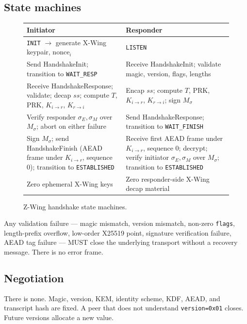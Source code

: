 \documentclass[11pt,a4paper]{article}
\begin{document}
\subsection{State machines}

\begin{figure}[H]
\centering
\begin{tabularx}{\textwidth}{XX}
\toprule
\textbf{Initiator} & \textbf{Responder} \\
\midrule
\texttt{INIT} $\to$ generate X-Wing keypair, $\mathrm{nonce}_i$ &
\texttt{LISTEN} \\
Send HandshakeInit; transition to \texttt{WAIT\_RESP} &
Receive HandshakeInit; validate magic, version, flags, lengths \\
Receive HandshakeResponse; validate; decap $ss$; compute $T$, $\mathrm{PRK}$, $K_{i\to r}$, $K_{r\to i}$ &
Encap $ss$; compute $T$, $\mathrm{PRK}$, $K_{i\to r}$, $K_{r\to i}$; sign $M_{\sigma}$ \\
Verify responder $\sigma_E, \sigma_M$ over $M_{\sigma}$; abort on either failure &
Send HandshakeResponse; transition to \texttt{WAIT\_FINISH} \\
Sign $M_{\sigma}$; send HandshakeFinish (AEAD frame under $K_{i\to r}$, sequence 0); transition to \texttt{ESTABLISHED} &
Receive first AEAD frame under $K_{i\to r}$, sequence 0; decrypt; verify initiator $\sigma_E, \sigma_M$ over $M_{\sigma}$; transition to \texttt{ESTABLISHED} \\
Zero ephemeral X-Wing keys & Zero responder-side X-Wing decap material \\
\bottomrule
\end{tabularx}
\caption{Z-Wing handshake state machines.}
\end{figure}

Any validation failure --- magic mismatch, version mismatch, non-zero
\texttt{flags}, length-prefix overflow, low-order X25519 point, signature
verification failure, AEAD tag failure --- MUST close the underlying
transport without a recovery message. There is no error frame.

\subsection{Negotiation}

There is none. Magic, version, KEM, identity scheme, KDF, AEAD, and
transcript hash are fixed. A peer that does not understand
\texttt{version=0x01} closes. Future versions allocate a new value.
\end{document}
